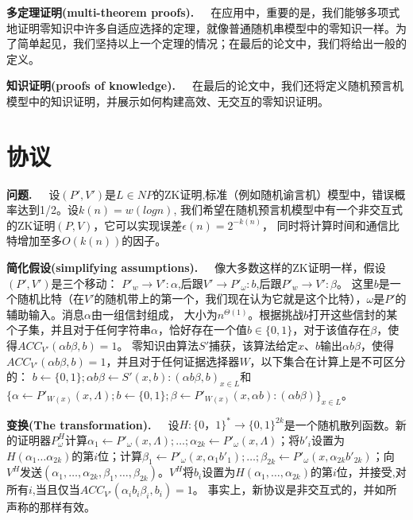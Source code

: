 \documentclass[]{article}
\begin{document}
    
    \textbf{多定理证明(multi-theorem proofs).}\ \ \ 
    在应用中，重要的是，我们能够多项式地证明零知识中许多自适应选择的定理，就像普通随机串模型中的零知识一样。为了简单起见，我们坚持以上一个定理的情况；在最后的论文中，我们将给出一般的定义。
    
    
    \textbf{知识证明(proofs of knowledge).}\ \ \ 
    在最后的论文中，我们还将定义随机预言机模型中的知识证明，并展示如何构建高效、无交互的零知识证明。
    
    
    \section{协议}
    
    \textbf{问题.}\ \ \ 
    设$(P',V')$是$L\in NP$的ZK证明,标准（例如随机谕言机）模型中，错误概率达到1/2。设$k(n)=w(log n)$, 我们希望在随机预言机模型中有一个非交互式的ZK证明$(P,V)$，它可以实现误差$\epsilon (n)=2^{-k(n)}$，
    同时将计算时间和通信比特增加至多$O(k(n))$的因子。
    
    
    \textbf{简化假设(simplifying assumptions).}\ \ \ 
    像大多数这样的ZK证明一样，假设$(P',V')$是三个移动：
    $P'_w\rightarrow V':\alpha$,后跟$V'\rightarrow P'_\omega:b$,后跟$P'_w\rightarrow V':\beta$。
    这里$b$是一个随机比特（在$V'$的随机带上的第一个，我们现在认为它就是这个比特），$\omega$是$P'$的辅助输入。消息$\alpha$由一组信封组成，
    大小为$n^{\Theta(1)}$。根据挑战$b$打开这些信封的某个子集，并且对于任何字符串$\alpha$，恰好存在一个值$b\in \{0,1\}$，对于该值存在$\beta$，使得$ACC_{V'}(\alpha b \beta,b)=1$。
    零知识由算法$S'$捕获，该算法给定$x$、$b$输出$\alpha b \beta$，使得$ACC_{V'}(\alpha b \beta,b)=1$，并且对于任何证据选择器$W$，以下集合在计算上是不可区分的：
    $b\leftarrow \{0,1\};\alpha b \beta\leftarrow S'(x,b):(\alpha b \beta,b)_{x\in L}$和
    $\{ \alpha \leftarrow P'_{W(x)}(x,\Lambda);b\leftarrow \{0,1\};\beta \leftarrow P'_{W(x)}(x,\alpha b):(\alpha b \beta)\}_{x\in L}$。
    
    
    \textbf{变换(The transformation).}\ \ \ 
    设$H:\{0，1\}^*\rightarrow \{0,1\}^{2k}$是一个随机散列函数。新的证明器$P_{\omega}^H$计算$\alpha_1\leftarrow P'_\omega(x,\Lambda);\ldots;\alpha_{2k}\leftarrow P'_\omega(x,\Lambda)$；将$b'_i$设置为$H(\alpha_1\ldots \alpha_{2k})$的第$i$位；计算$\beta_1\leftarrow P'_{\omega}(x,\alpha_1 b'_1);\ldots;\beta_{2k}\leftarrow P'_{\omega}(x,\alpha_{2k}b'_{2k})$；向$V^H$发送$(\alpha_1,\ldots,\alpha_{2k},\beta_1,\ldots,\beta_{2k})$。$V^H$将$b_i$设置为$H(\alpha_1,\ldots,\alpha_{2k})$的第$i$位，并接受,对所有$i$,当且仅当$ACC_{V'}(\alpha_i b_i \beta_i , b_i)=1$。
    事实上，新协议是非交互式的，并如所声称的那样有效。
    
\end{document}
